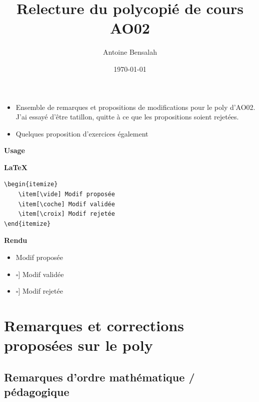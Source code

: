 \documentclass[11pt,a4paper]{article}
\title{Relecture du polycopié de cours AO02}
\author{Antoine Bensalah}
\date{\today}
\newcommand{\vide}{\Large $\square$}
\newcommand{\coche}{\makebox[0pt][l]{\raisebox{.2ex}{\hspace{0.1em}\Large\textcolor{green!60!black}{\ding{52}}}}\Large $\square$}
\newcommand{\croix}{\makebox[0pt][l]{\raisebox{.2ex}{\hspace{0.1em}\Large\textcolor{red}{\ding{56}}}}\Large $\square$}
\begin{document}
\maketitle

\noindent 
\begin{itemize}
    \item Ensemble de remarques et propositions de modifications pour le poly d'AO02. J'ai essayé d'être tatillon, quitte à ce que les propositions soient rejetées.
    \item Quelques proposition d'exercices également
\end{itemize}
\textbf{Usage}

\vspace{1em}
\noindent
\begin{minipage}[t]{0.50\textwidth}
\textbf{\LaTeX}
\vspace{-0.8em}
\begin{verbatim}
\begin{itemize}
    \item[\vide] Modif proposée
    \item[\coche] Modif validée
    \item[\croix] Modif rejetée
\end{itemize}
\end{verbatim}
\end{minipage}%
%
\hfill\vrule\hfill
%
\begin{minipage}[t]{0.45\textwidth}
\textbf{Rendu}
\begin{itemize}
    \item[\vide] Modif proposée
    \item[\coche] Modif validée
    \item[\croix] Modif rejetée
\end{itemize}
\end{minipage}
\vspace{1em}

\tableofcontents

\section{Remarques et corrections proposées sur le poly}

\subsection{Remarques d'ordre mathématique / pédagogique}
\end{document}
